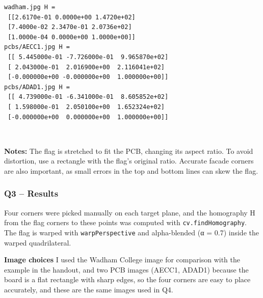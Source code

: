 \documentclass[11pt]{article}
\begin{document}
    \begin{Verbatim}[commandchars=\\\{\}]
wadham.jpg H =
 [[2.6170e-01 0.0000e+00 1.4720e+02]
 [7.4000e-02 2.3470e-01 2.0736e+02]
 [1.0000e-04 0.0000e+00 1.0000e+00]]
pcbs/AECC1.jpg H =
 [[ 5.445000e-01 -7.726000e-01  9.965870e+02]
 [ 2.043000e-01  2.016900e+00  2.116041e+02]
 [-0.000000e+00 -0.000000e+00  1.000000e+00]]
pcbs/ADAD1.jpg H =
 [[ 4.739000e-01 -6.341000e-01  8.605852e+02]
 [ 1.598000e-01  2.050100e+00  1.652324e+02]
 [-0.000000e+00  0.000000e+00  1.000000e+00]]
    \end{Verbatim}

    \begin{center}
    \end{center}
    { \hspace*{\fill} \\}
    
    \textbf{Notes:} The flag is stretched to fit the PCB, changing its
aspect ratio. To avoid distortion, use a rectangle with the flag's
original ratio. Accurate facade corners are also important, as small
errors in the top and bottom lines can skew the flag.

    \subsubsection{Q3 -- Results}\label{q3-results}

Four corners were picked manually on each target plane, and the
homography H from the flag corners to these points was computed with
\texttt{cv.findHomography}. The flag is warped with
\texttt{warpPerspective} and alpha-blended (α = 0.7) inside the warped
quadrilateral.

\textbf{Image choices} I used the Wadham College image for comparison
with the example in the handout, and two PCB images (AECC1, ADAD1)
because the board is a flat rectangle with sharp edges, so the four
corners are easy to place accurately, and these are the same images used
in Q4.
\end{document}
